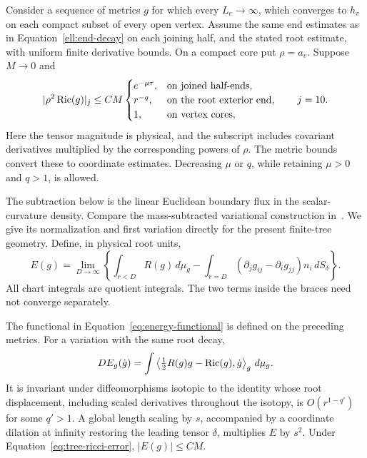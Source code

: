 Consider a sequence of metrics $g$ for which every $L_e\to\infty$,
which converges to $h_v$ on each compact subset of every open vertex.
Assume the same end estimates as in Equation~\eqref{ell:end-decay}
on each joining half, and the stated root estimate, with uniform
finite derivative bounds.  On a compact core put $\rho=a_v$.
Suppose $M\to0$ and
\begin{equation}
 |\rho^2\operatorname{Ric}(g)|_j\le CM
 \begin{cases}
 e^{-\mu\tau},&\text{on joined half-ends},\\
 r^{-q},&\text{on the root exterior end},\\
 1,&\text{on vertex cores},
 \end{cases}
 \qquad j=10.
 \label{eq:tree-ricci-error}
\end{equation}
Here the tensor magnitude is physical, and the subscript includes
covariant derivatives multiplied by the corresponding powers of
$\rho$.  The metric bounds convert these to coordinate estimates.
Decreasing $\mu$ or $q$, while retaining $\mu>0$ and $q>1$, is allowed.

The subtraction below is the linear Euclidean boundary flux in the
scalar-curvature density. Compare the mass-subtracted variational
construction in~\cite[Remark~4.3 and Proposition~4.4]{DeruelleOzuch2025}.
We give its normalization and first variation directly for the present
finite-tree geometry. Define, in physical root units,
\begin{equation}
 E(g)=\lim_{D\to\infty}\left\{
 \int_{r<D}R(g)\,d\mu_g-
 \int_{r=D}(\partial_jg_{ij}-\partial_ig_{jj})n_i\,dS_\delta
 \right\}.
 \label{eq:energy-functional}
\end{equation}
All chart integrals are quotient integrals.  The two terms inside the
braces need not converge separately.

\begin{lemma}
\label{ell:functional}
The functional in Equation~\eqref{eq:energy-functional} is defined on
the preceding metrics.  For a variation with the same root decay,
\begin{equation}
 DE_g(\dot g)=\int\left\langle\tfrac12R(g)g-\operatorname{Ric}(g),\dot g\right\rangle_g
 \,d\mu_g.
 \label{ell:first-variation}
\end{equation}
It is invariant under diffeomorphisms isotopic to the identity whose
root displacement, including scaled derivatives throughout the
isotopy, is $O(r^{1-q'})$ for some $q'>1$.  A global length scaling
by $s$, accompanied by a coordinate dilation at infinity restoring
the leading tensor $\delta$, multiplies $E$ by $s^2$.
Under Equation~\eqref{eq:tree-ricci-error}, $|E(g)|\le CM$.
\end{lemma}

